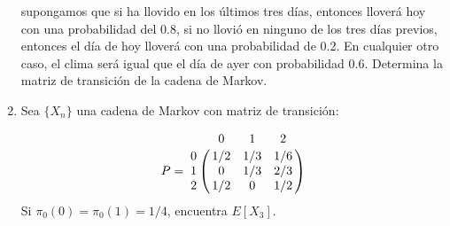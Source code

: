 \documentclass[12pt]{report}
\begin{document}
\begin{enumerate}
supongamos que si ha llovido en los últimos tres días, entonces lloverá hoy con una probabilidad del 0.8, si no llovió en ninguno de los tres días previos, entonces el día de hoy lloverá con una probabilidad de 0.2. En cualquier otro caso, el clima será igual que el día de ayer con probabilidad 0.6. Determina la matriz de transición de la cadena de Markov.
\item Sea $\{X_n\}$ una cadena de Markov con matriz de transición:

$$
P = \bordermatrix{~ & 0   & 1   & 2 \cr
                  0 & 1/2 & 1/3 & 1/6 \cr
                  1 & 0   & 1/3 & 2/3 \cr
                  2 & 1/2 & 0   & 1/2 \cr             
                  }
$$
Si $\pi_0(0) = \pi_0(1)=1/4$, encuentra $E[X_3]$.
\end{enumerate}
\end{document}
